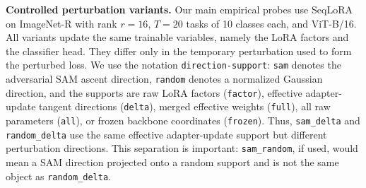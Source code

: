 \documentclass{article}
\begin{document}
\noindent\textbf{Controlled perturbation variants.}\quad
Our main empirical probes use SeqLoRA on ImageNet-R with rank $r=16$, $T=20$ tasks of 10 classes each, and ViT-B/16.
All variants update the same trainable variables, namely the LoRA factors and the classifier head.
They differ only in the temporary perturbation used to form the perturbed loss.
We use the notation \texttt{direction-support}: \texttt{sam} denotes the adversarial SAM ascent direction, \texttt{random} denotes a normalized Gaussian direction, and the supports are raw LoRA factors (\texttt{factor}), effective adapter-update tangent directions (\texttt{delta}), merged effective weights (\texttt{full}), all raw parameters (\texttt{all}), or frozen backbone coordinates (\texttt{frozen}).
Thus, \texttt{sam_delta} and \texttt{random_delta} use the same effective adapter-update support but different perturbation directions.
This separation is important: \texttt{sam_random}, if used, would mean a SAM direction projected onto a random support and is not the same object as \texttt{random_delta}.



\end{document}
